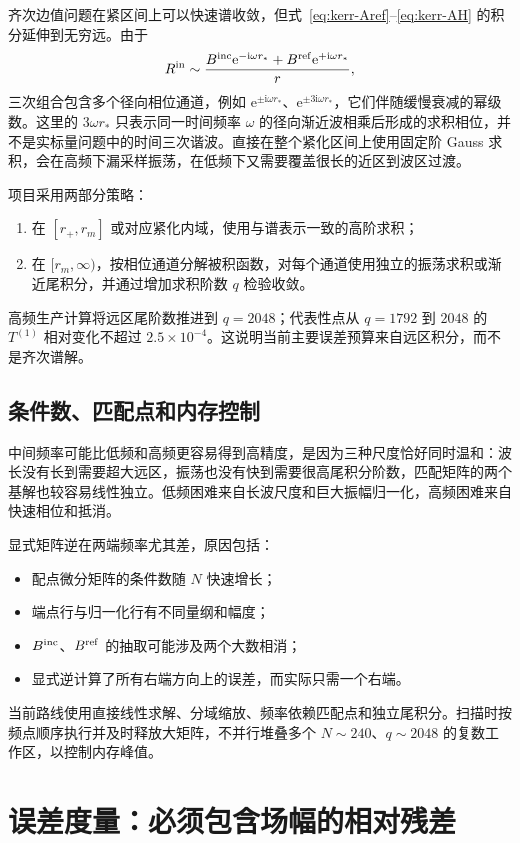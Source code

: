 \documentclass[UTF8,a4paper,11pt]{ctexart}
\newcommand{\ii}{\mathrm i}
\newcommand{\ee}{\mathrm e}
\newcommand{\Bin}{B^{\rm inc}}
\newcommand{\Bref}{B^{\rm ref}}
\begin{document}
齐次边值问题在紧区间上可以快速谱收敛，但式~\eqref{eq:kerr-Aref}--\eqref{eq:kerr-AH} 的积分延伸到无穷远。由于
\begin{equation}
R^{\rm in}\sim\frac{\Bin\ee^{-\ii\omega r_*}+\Bref\ee^{+\ii\omega r_*}}{r},
\end{equation}
三次组合包含多个径向相位通道，例如 $\ee^{\pm\ii\omega r_*}$、$\ee^{\pm3\ii\omega r_*}$，它们伴随缓慢衰减的幂级数。这里的 $3\omega r_*$ 只表示同一时间频率 $\omega$ 的径向渐近波相乘后形成的求积相位，并不是实标量问题中的时间三次谐波。直接在整个紧化区间上使用固定阶 Gauss 求积，会在高频下漏采样振荡，在低频下又需要覆盖很长的近区到波区过渡。

项目采用两部分策略：
\begin{enumerate}
\item 在 $[r_+,r_m]$ 或对应紧化内域，使用与谱表示一致的高阶求积；
\item 在 $[r_m,\infty)$，按相位通道分解被积函数，对每个通道使用独立的振荡求积或渐近尾积分，并通过增加求积阶数 $q$ 检验收敛。
\end{enumerate}
高频生产计算将远区尾阶数推进到 $q=2048$；代表性点从 $q=1792$ 到 $2048$ 的 $T^{(1)}$ 相对变化不超过 $2.5\times10^{-4}$。这说明当前主要误差预算来自远区积分，而不是齐次谱解。

\subsection{条件数、匹配点和内存控制}

中间频率可能比低频和高频更容易得到高精度，是因为三种尺度恰好同时温和：波长没有长到需要超大远区，振荡也没有快到需要很高尾积分阶数，匹配矩阵的两个基解也较容易线性独立。低频困难来自长波尺度和巨大振幅归一化，高频困难来自快速相位和抵消。

显式矩阵逆在两端频率尤其差，原因包括：
\begin{itemize}
\item 配点微分矩阵的条件数随 $N$ 快速增长；
\item 端点行与归一化行有不同量纲和幅度；
\item $\Bin$、$\Bref$ 的抽取可能涉及两个大数相消；
\item 显式逆计算了所有右端方向上的误差，而实际只需一个右端。
\end{itemize}
当前路线使用直接线性求解、分域缩放、频率依赖匹配点和独立尾积分。扫描时按频点顺序执行并及时释放大矩阵，不并行堆叠多个 $N\sim240$、$q\sim2048$ 的复数工作区，以控制内存峰值。

\section{误差度量：必须包含场幅的相对残差}
\label{sec:diagnostics}
\end{document}
